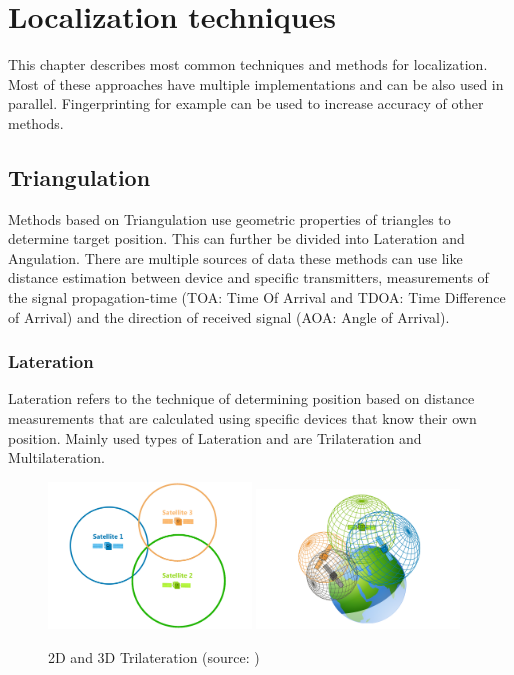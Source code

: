 \chapter{Localization techniques}\label{sec:LocalizationTechniques}
This chapter describes most common techniques and methods for localization. Most of these approaches have multiple implementations and can be also used in parallel. Fingerprinting for example can be used to increase accuracy of other methods.

\section{Triangulation}\label{sec:Triangulation}
Methods based on Triangulation use geometric properties of triangles to determine target position. This can further be divided into Lateration and Angulation. \cite{RAinWILTaS} There are multiple sources of data these methods can use like distance estimation between device and specific transmitters, measurements of the signal propagation-time (TOA: Time Of Arrival and TDOA: Time Difference of Arrival\cite{LTinWSN}) and the direction of received
signal (AOA: Angle of Arrival\cite{AoALforWSN}).\cite{IILUBLEB}

\subsection{Lateration}\label{sec:Lateration}
Lateration refers to the technique of determining position based on distance measurements that are calculated using specific devices that know their own position.  Mainly used types of Lateration and are Trilateration and Multilateration. 

\begin{figure}[h!]
	\begin{centering}
		\includegraphics[width=0.48\textwidth]{img/trilateration_2d}
		\includegraphics[width=0.48\textwidth]{img/trilateration_3d}
		\par\end{centering}
	\caption{2D and 3D Trilateration (source: \cite{TvTHGPSRW})\label{fig:2d_and_3d_trilateration}}
	\label{fig2}
\end{figure}

